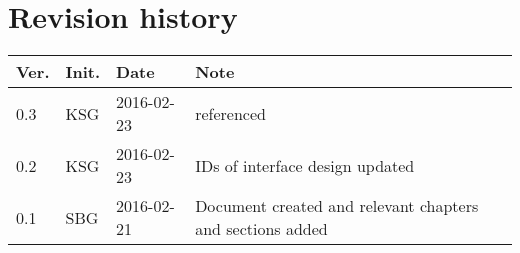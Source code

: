 \label{chp_revisionHistory}
\chapter*{Revision history}

\begin{tabular}{b{1cm} b{1cm} b{2cm} b{8cm}}
	\textbf{Ver.} & \textbf{Init.} & \textbf{Date} & \textbf{Note}\\
	\hline
	0.3 & KSG & 2016-02-23 & \aadisddd referenced \\
	0.2 & KSG & 2016-02-23 & IDs of interface design updated \\
    0.1 & SBG & 2016-02-21 & Document created and relevant chapters and sections added \\
\end{tabular}

